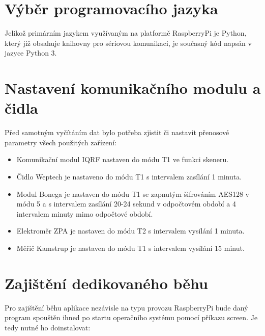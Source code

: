 \section{Výběr programovacího jazyka}
Jelikož primárním jazykem využívaným na platformě RaspberryPi je Python, který již obsahuje knihovny pro sériovou komunikaci, je současný kód napsán v jazyce Python 3.


\section{Nastavení komunikačního modulu a čidla}

Před samotným vyčítáním dat bylo potřeba zjistit či nastavit přenosové parametry všech použitých zařízení:

\begin{itemize}
	\item Komunikační modul IQRF nastaven do módu T1 ve funkci skeneru.
	\item Čidlo Weptech je nastaveno do módu T1 s intervalem zasílání 1 minuta. 
	\item Modul Bonega je nastaven do módu T1 se zapnutým šifrováním AES128 v módu 5 a s intervalem zasílání 20-24 sekund v odpočtovém období a 4 intervalem minuty mimo odpočtové období.
	\item Elektroměr ZPA je nastaven do módu T2 s intervalem vysílání 1 minuta.
	\item Měřič Kamstrup je nastaven do módu T1 s intervalem vysílání 15 minut.
\end{itemize}


\section{Zajištění dedikovaného běhu}
Pro zajištění běhu aplikace nezávisle na typu provozu RaspberryPi bude daný program spouštěn ihned po startu operačního systému pomocí příkazu screen. Je tedy nutné ho doinstalovat:
 

